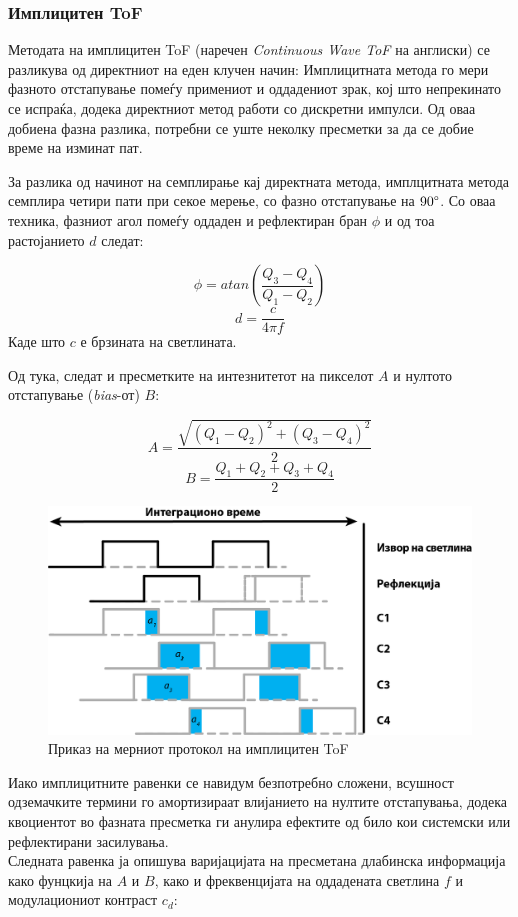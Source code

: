 \documentclass[12pt]{article}
\begin{document}
	\subsubsection{Имплицитен ToF}
		Методата на имплицитен ToF (наречен \textit{Continuous Wave ToF} на англиски) се разликува од директниот на еден клучен начин: Имплицитната метода го мери фазното отстапување помеѓу примениот и оддадениот зрак, кој што непрекинато се испраќа, додека директниот метод работи со дискретни импулси. Од оваа добиена фазна разлика, потребни се уште неколку пресметки за да се добие време на изминат пат.

		За разлика од начинот на семплирање кај директната метода, имплцитната метода семплира четири пати при секое мерење, со фазно отстапување на $90\degree$. Со оваа техника, фазниот агол помеѓу оддаден и рефлектиран бран $\phi$ и од тоа растојанието $d$ следат:

		$$ \phi = atan(\frac{Q_3 - Q_4}{Q_1 - Q_2}) $$
		$$ d = \frac{c}{4\pi f} $$
		Каде што $c$ е брзината на светлината.


		Од тука, следат и пресметките на интезнитетот на пикселот $A$ и нултото отстапување (\textit{bias}-от) $B$:

		$$ A = \frac{\sqrt{(Q_1 - Q_2)^2  + (Q_3 - Q_4)^2}}{2} $$
		$$ B = \frac{Q_1 + Q_2 + Q_3 + Q_4}{2} $$


		\begin{figure}[H]
			\includegraphics[width=0.75\linewidth]{./images/CWToF.png}
			\centering
			\caption{Приказ на мерниот протокол на имплицитен ToF}
			\label{fig:CWToF.png}
			\end{figure}

		Иако имплицитните равенки се навидум безпотребно сложени, всушност одземачките термини го амортизираат влијанието на нултите отстапувања, додека квоциентот во фазната пресметка ги анулира ефектите од било кои системски или рефлектирани засилувања.\\
		Следната равенка ја опишува варијацијата на пресметана длабинска информација како фунцкија на $A$ и $B$, како и фреквенцијата на оддадената светлина $f$ и модулациониот контраст $c_d$:
\end{document}
